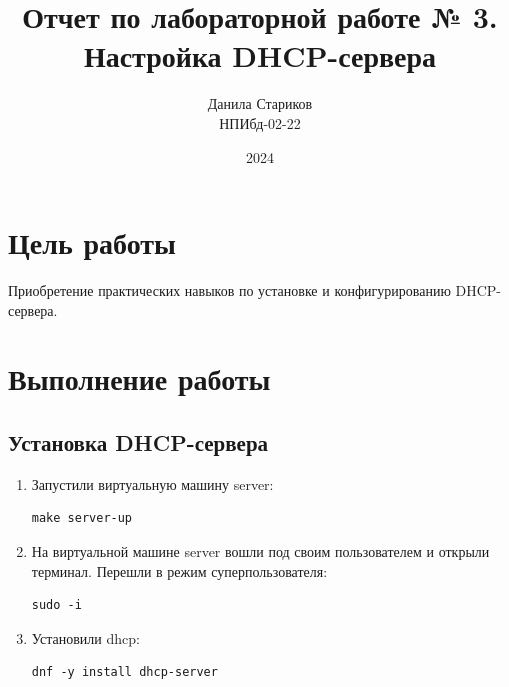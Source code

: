 

\title{Отчет по лабораторной работе № 3. \\ Настройка DHCP-сервера}
\author{Данила Стариков \\ НПИбд-02-22}
\date{2024}



\maketitle
\newpage

\tableofcontents

\newpage
\section{Цель работы}
Приобретение практических навыков по установке и конфигурированию DHCP-сервера.

\newpage
\section{Выполнение работы}

\subsection{Установка DHCP-сервера}
\begin{enumerate}
\item Запустили виртуальную машину server:
    \begin{verbatim}
make server-up
    \end{verbatim}
\item На виртуальной машине server вошли под своим пользователем и открыли терминал. Перешли в режим суперпользователя:
    \begin{verbatim}
sudo -i
    \end{verbatim}
\item Установили dhcp:
    \begin{verbatim}
dnf -y install dhcp-server
    \end{verbatim}
\end{enumerate}

